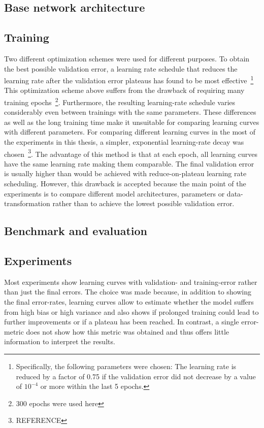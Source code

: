


\subsection{Base network architecture}



\subsection{Training}
\label{sec:training}

Two different optimization schemes were used for different purposes.
To obtain the best possible validation error, a learning rate schedule that reduces the learning rate after the validation error plateaus has found to be most effective~\footnote{Specifically, the following parameters were chosen: The learning rate is reduced by a factor of 0.75 if the validation error did not decrease by a value of $10^{-4}$ or more within the last 5 epochs.} This optimization scheme above suffers from the drawback of requiring many training epochs~\footnote{300 epochs were used here}. Furthermore, the resulting learning-rate schedule varies considerably even between trainings with the same parameters. These differences as well as the long training time make it unsuitable for comparing learning curves with different parameters.
For comparing different learning curves in the most of the experiments in this thesis, a simpler, exponential learning-rate decay was chosen~\footnote{REFERENCE}. The advantage of this method is that at each epoch, all learning curves have the same learning rate making them comparable. The final validation error is usually higher than would be achieved with reduce-on-plateau learning rate scheduling. However, this drawback is accepted because the main point of the experiments is to compare different model architectures, parameters or data-transformation rather than to achieve the lowest possible validation error.



\subsection{Benchmark and evaluation}


\subsection{Experiments}

Most experiments show learning curves with validation- and training-error rather than just the final errors. The choice was made because, in addition to showing the final error-rates, learning curves allow to estimate whether the model suffers from high bias or high variance and also shows if prolonged training could lead to further improvements or if a plateau has been reached. In contrast, a single error-metric does not show how this metric was obtained and thus offers little information to interpret the results.


